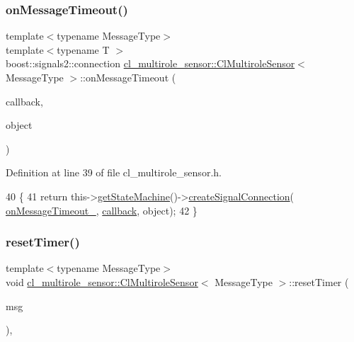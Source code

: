 \subsubsection{\texorpdfstring{on\+Message\+Timeout()}{onMessageTimeout()}}
{\footnotesize\ttfamily template$<$typename Message\+Type$>$ \\
template$<$typename T $>$ \\
boost\+::signals2\+::connection \hyperlink{classcl__multirole__sensor_1_1ClMultiroleSensor}{cl\+\_\+multirole\+\_\+sensor\+::\+Cl\+Multirole\+Sensor}$<$ Message\+Type $>$\+::on\+Message\+Timeout (\begin{DoxyParamCaption}\item[{void(T\+::$\ast$)(const ros\+::\+Timer\+Event \&)}]{callback,  }\item[{T $\ast$}]{object }\end{DoxyParamCaption})\hspace{0.3cm}{\ttfamily [inline]}}



Definition at line 39 of file cl\+\_\+multirole\+\_\+sensor.\+h.


\begin{DoxyCode}
40   \{
41     \textcolor{keywordflow}{return} this->\hyperlink{classsmacc_1_1ISmaccClient_aec51d4712404cb9882b86e4c854bb93a}{getStateMachine}()->\hyperlink{classsmacc_1_1ISmaccStateMachine_adf0f42ade0c65cc471960fe2a7c42da2}{createSignalConnection}(
      \hyperlink{classcl__multirole__sensor_1_1ClMultiroleSensor_afd37257b949c421d4f579b47352be95f}{onMessageTimeout\_}, \hyperlink{servers_2opencv__perception__node_2opencv__perception__node_8cpp_a050e697bd654facce10ea3f6549669b3}{callback}, \textcolor{keywordtype}{object});
42   \}
\end{DoxyCode}
\mbox{\label{classcl__multirole__sensor_1_1ClMultiroleSensor_afa5b63048466234906971db69677b3f0}} 
\subsubsection{\texorpdfstring{reset\+Timer()}{resetTimer()}}
{\footnotesize\ttfamily template$<$typename Message\+Type$>$ \\
void \hyperlink{classcl__multirole__sensor_1_1ClMultiroleSensor}{cl\+\_\+multirole\+\_\+sensor\+::\+Cl\+Multirole\+Sensor}$<$ Message\+Type $>$\+::reset\+Timer (\begin{DoxyParamCaption}\item[{const Message\+Type \&}]{msg }\end{DoxyParamCaption})\hspace{0.3cm}{\ttfamily [inline]}, {\ttfamily [protected]}}



